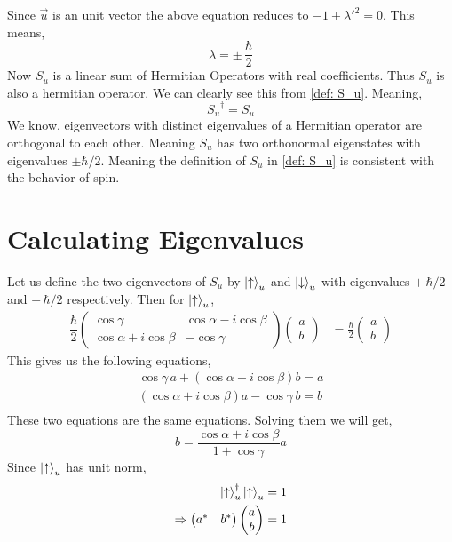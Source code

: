 \documentclass[a4paper, 12pt]{article}
\renewcommand{\indent}{\hspace{3ex}}
\newcommand{\Su}{\dfrac{\hbar}{2} \begin{pmatrix} \cos \gamma & \cos \alpha - i \cos \beta \\ \cos \alpha + i \cos \beta & - \cos \gamma \end{pmatrix}}
\begin{document}
Since $\vec u$ is an unit vector the above equation reduces to $-1 + {\lambda'}^2 = 0$. This means,
\begin{equation}
	\lambda = \pm \, \frac{\hbar}{2}
\end{equation}
Now $S_u$ is a linear sum of Hermitian Operators with real coefficients. Thus $S_u$ is also a hermitian operator. We can clearly see this from \eqref{def: S_u}. Meaning,
\begin{equation}
	{S_u}^\dagger = S_u
\end{equation}
We know, eigenvectors with distinct eigenvalues of a Hermitian operator are orthogonal to each other. Meaning $S_u$ has two orthonormal eigenstates with eigenvalues $\pm \hbar/2$. Meaning the definition of $S_u$ in \eqref{def: S_u} is consistent with the behavior of spin.


\section{Calculating Eigenvalues}
\indent Let us define the two eigenvectors of $S_u$ by $\ket{\uparrow}_u$ and $\ket{\downarrow}_u$ with eigenvalues $+ \, \hbar/2$ and $+ \, \hbar/2$ respectively. Then for $\ket{\uparrow}_u$,
\begin{align*}
	\Su \begin{pmatrix} a \\ b \end{pmatrix} &= \frac{\hbar}{2} \begin{pmatrix} a \\ b \end{pmatrix}
\end{align*}
This gives us the following equations,
\begin{align*}
	\cos \gamma \, a + (\cos \alpha - i \cos \beta) b = a\\
	(\cos \alpha + i \cos \beta) a - \cos \gamma \, b = b\\
\end{align*}
These two equations are the same equations. Solving them we will get,
\begin{equation}
	b = \frac{\cos \alpha + i \cos\beta}{1 + \cos \gamma} a
	\label{ex: b in terms of a}
\end{equation}
Since $\ket{\uparrow}_u$ has unit norm,
\begin{align*}
	\ket{\uparrow}_u^\dagger \ket{\uparrow}_u &= 1\\
	\Rightarrow \begin{pmatrix} a^* &b^* \end{pmatrix} \begin{pmatrix} a \\b \end{pmatrix} &= 1
\end{align*}
\end{document}
